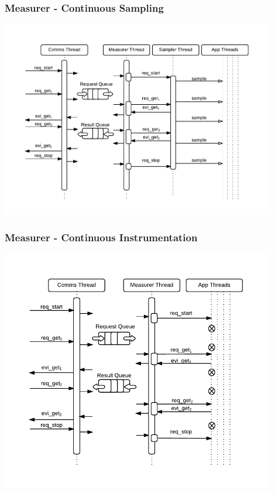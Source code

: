 \documentclass{beamer}
\begin{document}
\begin{frame}
  \frametitle{Measurer - Continuous Sampling}
  \begin{center}
  \includegraphics[width=0.9\textwidth]{figures/Measurer_Sampler.pdf}
  \end{center}  
\end{frame}

\begin{frame}
  \frametitle{Measurer - Continuous Instrumentation}
  \begin{center}
  \includegraphics[width=0.9\textwidth]{figures/Measurer_Instrumentor.pdf}
  \end{center}  
\end{frame}
\end{document}
